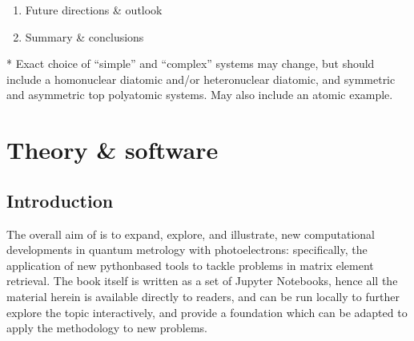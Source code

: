 \documentclass[letterpaper,table,10pt,english]{jupyterBook}
\begin{document}
\begin{enumerate}
\sphinxAtStartPar
c.  Direct molecular frame reconstruction via matrix\sphinxhyphen{}inversion
methods.

\sphinxAtStartPar
d.  Comparison of methods.

\sphinxAtStartPar
e.  Information content/quantum information analysis.

\item {} 
\sphinxAtStartPar
Future directions \& outlook

\item {} 
\sphinxAtStartPar
Summary \& conclusions

\end{enumerate}

\sphinxAtStartPar
* Exact choice of “simple” and “complex” systems may change, but should
include a homonuclear diatomic and/or heteronuclear diatomic, and
symmetric and asymmetric top polyatomic systems. May also include an
atomic example.

\sphinxstepscope


\part{Theory \& software}

\sphinxstepscope


\chapter{Introduction}
\label{\detokenize{part1/main_intro_051122:introduction}}\label{\detokenize{part1/main_intro_051122:chpt-intro}}\label{\detokenize{part1/main_intro_051122::doc}}
\sphinxAtStartPar
The overall aim of  is to expand, explore, and illustrate, new computational developments in quantum metrology with photoelectrons: specifically, the application of new python\sphinxhyphen{}based tools to tackle problems in matrix element retrieval. The book itself is written as a set of Jupyter Notebooks, hence all the material herein is available directly to readers, and can be run locally to further explore the topic interactively, and provide a foundation which can be adapted to apply the methodology to new problems.
\end{document}

